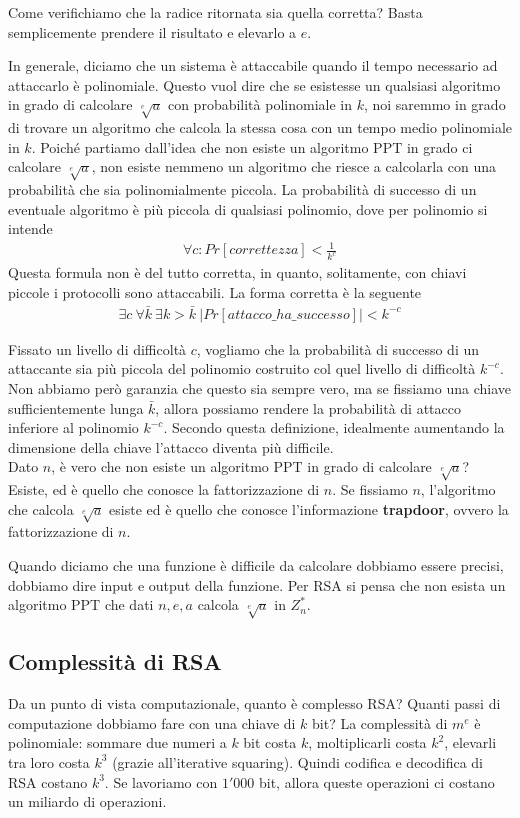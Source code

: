 Come verifichiamo che la radice ritornata sia quella corretta? Basta semplicemente prendere il risultato e elevarlo a $e$.

In generale, diciamo che un sistema è attaccabile quando il tempo necessario ad attaccarlo è polinomiale. Questo vuol dire che se esistesse un qualsiasi algoritmo in grado di calcolare $ \sqrt[e]{a}$ con probabilità polinomiale in $k$, noi saremmo in grado di trovare un algoritmo che calcola la stessa cosa con un tempo medio polinomiale in $k$. 
Poiché partiamo dall'idea che non esiste un algoritmo PPT in grado ci calcolare $ \sqrt[e]{a}$, non esiste nemmeno un algoritmo che riesce a calcolarla con una probabilità che sia polinomialmente piccola. La probabilità di successo di un eventuale algoritmo è più piccola di qualsiasi polinomio, dove per polinomio si intende
\begin{align*}
    \forall c : Pr[correttezza] < \frac{1}{k^c}
\end{align*}
\noindent Questa formula non è del tutto corretta, in quanto, solitamente, con chiavi piccole i protocolli sono attaccabili. La forma corretta è la seguente
\begin{align*}
    \exists c \ \forall \bar{k} \ \exists k > \bar{k} \ \big|Pr[attacco\_ha\_successo]\big| < k^{-c}
\end{align*}

\noindent Fissato un livello di difficoltà $c$, vogliamo che la probabilità di successo di un attaccante sia più piccola del polinomio costruito col quel livello di difficoltà $k^{-c}$. Non abbiamo però garanzia che questo sia sempre vero, ma se fissiamo una chiave sufficientemente lunga $\bar{k}$, allora possiamo rendere la probabilità di attacco inferiore al polinomio $k^{-c}$. Secondo questa definizione, idealmente aumentando la dimensione della chiave l'attacco diventa più difficile.\\

\noindent Dato $n$, è vero che non esiste un algoritmo PPT in grado di calcolare $\sqrt[e]{a}$? Esiste, ed è quello che conosce la fattorizzazione di $n$. Se fissiamo $n$, l'algoritmo che calcola $\sqrt[e]{a}$ esiste ed è quello che conosce l'informazione \textbf{trapdoor}, ovvero la fattorizzazione di $n$.

Quando diciamo che una funzione è difficile da calcolare dobbiamo essere precisi, dobbiamo dire input e output della funzione. Per RSA si pensa che non esista un algoritmo PPT che dati $n, e, a$ calcola $\sqrt[e]{a}$ in $Z_n^*$.

\subsection{Complessità di RSA}
Da un punto di vista computazionale, quanto è complesso RSA? Quanti passi di computazione dobbiamo fare con una chiave di $k$ bit? La complessità di $m^e$ è polinomiale: sommare due numeri a $k$ bit costa $k$, moltiplicarli costa $k^2$, elevarli tra loro costa $k^3$ (grazie all'iterative squaring). Quindi codifica e decodifica di RSA costano $k^3$. Se lavoriamo con $1'000$ bit, allora queste operazioni ci costano un miliardo di operazioni.

